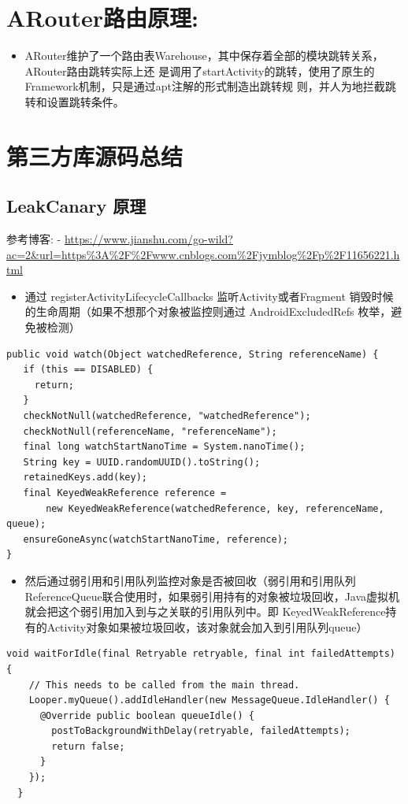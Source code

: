 \documentclass[9pt, b5paper]{article}
\begin{document}
\section{ARouter路由原理:}
\label{sec-7}
\begin{itemize}
\item ARouter维护了一个路由表Warehouse，其中保存着全部的模块跳转关系，ARouter路由跳转实际上还 是调用了startActivity的跳转，使用了原生的Framework机制，只是通过apt注解的形式制造出跳转规 则，并人为地拦截跳转和设置跳转条件。
\end{itemize}

\section{第三方库源码总结}
\label{sec-8}
\subsection{LeakCanary 原理}
\label{sec-8-1}
参考博客: - \url{https://www.jianshu.com/go-wild?ac=2&url=https\%3A\%2F\%2Fwww.cnblogs.com\%2Fjymblog\%2Fp\%2F11656221.html}
\begin{itemize}
\item 通过 registerActivityLifecycleCallbacks 监听Activity或者Fragment 销毁时候的生命周期（如果不想那个对象被监控则通过 AndroidExcludedRefs 枚举，避免被检测）
\end{itemize}
\begin{verbatim}
public void watch(Object watchedReference, String referenceName) {
   if (this == DISABLED) {
     return;
   }
   checkNotNull(watchedReference, "watchedReference");
   checkNotNull(referenceName, "referenceName");
   final long watchStartNanoTime = System.nanoTime();
   String key = UUID.randomUUID().toString();
   retainedKeys.add(key);
   final KeyedWeakReference reference =
       new KeyedWeakReference(watchedReference, key, referenceName, queue);
   ensureGoneAsync(watchStartNanoTime, reference);
}
\end{verbatim}
\begin{itemize}
\item 然后通过弱引用和引用队列监控对象是否被回收（弱引用和引用队列ReferenceQueue联合使用时，如果弱引用持有的对象被垃圾回收，Java虚拟机就会把这个弱引用加入到与之关联的引用队列中。即 KeyedWeakReference持有的Activity对象如果被垃圾回收，该对象就会加入到引用队列queue）
\end{itemize}
\begin{verbatim}
void waitForIdle(final Retryable retryable, final int failedAttempts) {
    // This needs to be called from the main thread.
    Looper.myQueue().addIdleHandler(new MessageQueue.IdleHandler() {
      @Override public boolean queueIdle() {
        postToBackgroundWithDelay(retryable, failedAttempts);
        return false;
      }
    });
  }
\end{verbatim}
\end{document}
